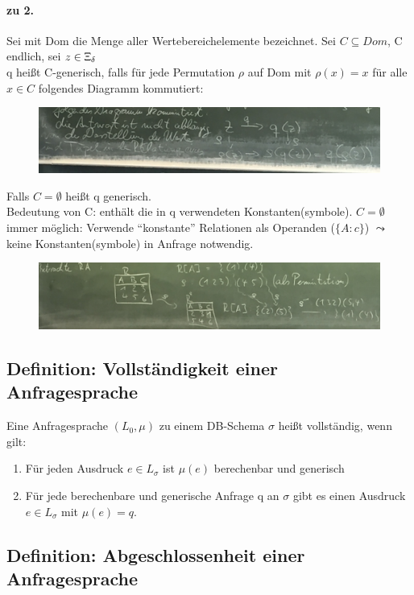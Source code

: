 \documentclass[12pt, a4paper]{article}
\begin{document}
\paragraph{zu 2.} Sei mit Dom die Menge aller Wertebereichelemente bezeichnet. Sei $C \subseteq Dom$, C endlich, sei $z \in \Upxi_\delta$ \\
q heißt C-generisch, falls für jede Permutation $\rho$ auf Dom mit $\rho(x) = x$ für alle $x \in C$ folgendes Diagramm kommutiert:
\begin{figure}[h!]
\centering
\includegraphics[width=0.7\linewidth]{img/img19}
\caption{}
\label{fig:img19}
\end{figure}

Falls $C = \emptyset$ heißt q generisch. \\
Bedeutung von C: enthält die in q verwendeten Konstanten(symbole). $C = \emptyset$ immer möglich: Verwende ``konstante'' Relationen als Operanden ($\{A : c \}$) $\leadsto$ keine Konstanten(symbole) in Anfrage notwendig.

\begin{figure}[h!]
\centering
\includegraphics[width=0.7\linewidth]{img/img20}
\caption{}
\label{fig:img20}
\end{figure}

\subsection*{Definition: Vollständigkeit einer Anfragesprache}

Eine Anfragesprache $(L_0, \mu)$ zu einem DB-Schema $\sigma$ heißt vollständig, wenn gilt: 
\begin{enumerate}
\item Für jeden Ausdruck $e \in L_\sigma$ ist $\mu(e)$ berechenbar und generisch
\item Für jede berechenbare und generische Anfrage q an $\sigma$ gibt es einen Ausdruck $e \in L_\sigma$ mit $\mu(e) = q$.
\end{enumerate}


\subsection*{Definition: Abgeschlossenheit einer Anfragesprache}
\end{document}
